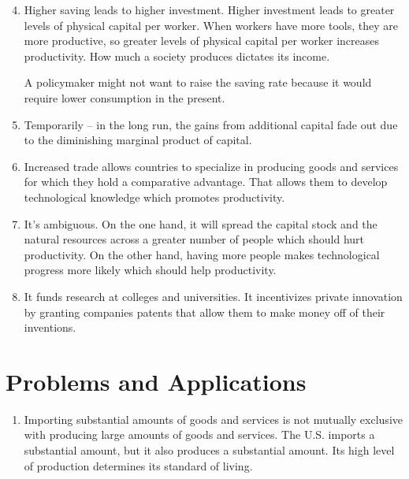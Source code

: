 \documentclass{article}
\begin{document}
\begin{enumerate}

\setcounter{enumi}{3}

\item Higher saving leads to higher investment. Higher investment leads to greater levels of physical capital per worker. When workers have more tools, they are more productive, so greater levels of physical capital per worker increases productivity. How much a society produces dictates its income.

A policymaker might not want to raise the saving rate because it would require lower consumption in the present. 

\item Temporarily -- in the long run, the gains from additional capital fade out due to the diminishing marginal product of capital. 

\item Increased trade allows countries to specialize in producing goods and services for which they hold a comparative advantage. That allows them to develop technological knowledge which promotes productivity.

\item It's ambiguous. On the one hand, it will spread the capital stock and the natural resources across a greater number of people which should hurt productivity. On the other hand, having more people makes technological progress more likely which should help productivity.

\item It funds research at colleges and universities. It incentivizes private innovation by granting companies patents that allow them to make money off of their inventions.

\end{enumerate}

\section*{Problems and Applications}

\begin{enumerate}

\item Importing substantial amounts of goods and services is not mutually exclusive with producing large amounts of goods and services. The U.S. imports a substantial amount, but it also produces a substantial amount. Its high level of production determines its standard of living.

\end{enumerate}
\end{document}
